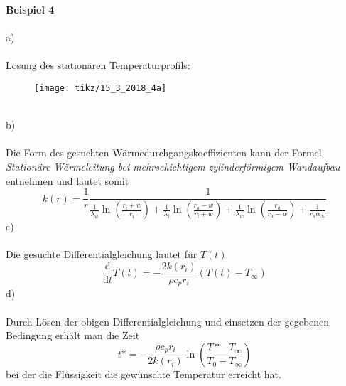 \textbf{Beispiel 4}\\ \\
a)\\ \\
Lösung des stationären Temperaturprofils:
\begin{figure}[h]
	\centering
	\texttt{[image: tikz/15\_3\_2018\_4a]}
\end{figure}
\newline \\
b)\\ \\
Die Form des gesuchten Wärmedurchgangskoeffizienten kann der Formel \textit{Stationäre Wärmeleitung bei mehrschichtigem zylinderförmigem Wandaufbau} entnehmen und lautet somit
\[
	k(r) = \frac{1}{r}\frac{1}{\frac{1}{\lambda_w}\ln\left(\frac{r_i + w}{r_i}\right) + \frac{1}{\lambda_i}\ln\left(\frac{r_a - w}{r_i + w}\right) + \frac{1}{\lambda_w}\ln\left(\frac{r_a}{r_a - w}\right) + \frac{1}{r_a\alpha_\infty}}
\]
c)\\ \\
Die gesuchte Differentialgleichung lautet für $T(t)$
\[
	\frac{\text{d}}{\text{d}t}T(t) = -\frac{2k(r_i)}{\rho c_p r_i}(T(t) - T_\infty)
\]
d) \\ \\
Durch Lösen der obigen Differentialgleichung und einsetzen der gegebenen Bedingung erhält man die Zeit
\[
	t* = -\frac{\rho c_p r_i}{2k(r_i)}\ln\left(\frac{T* - T_\infty}{T_0 - T_\infty}\right)
\]
bei der die Flüssigkeit die gewünschte Temperatur erreicht hat.\\ \\